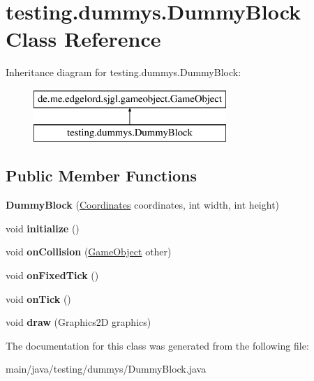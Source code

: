 \hypertarget{classtesting_1_1dummys_1_1_dummy_block}{}\section{testing.\+dummys.\+Dummy\+Block Class Reference}
\label{classtesting_1_1dummys_1_1_dummy_block}
Inheritance diagram for testing.\+dummys.\+Dummy\+Block\+:\begin{figure}[H]
\begin{center}
\leavevmode
\includegraphics[height=2.000000cm]{classtesting_1_1dummys_1_1_dummy_block}
\end{center}
\end{figure}
\subsection*{Public Member Functions}
\begin{DoxyCompactItemize}
\item 
\mbox{\label{classtesting_1_1dummys_1_1_dummy_block_afb4e413d6812d3b0d3d089701dc2aa95}} 
{\bfseries Dummy\+Block} (\mbox{\hyperlink{classde_1_1me_1_1edgelord_1_1sjgl_1_1location_1_1_coordinates}{Coordinates}} coordinates, int width, int height)
\item 
\mbox{\label{classtesting_1_1dummys_1_1_dummy_block_aed6daf192215fd235750c10ddef07c63}} 
void {\bfseries initialize} ()
\item 
\mbox{\label{classtesting_1_1dummys_1_1_dummy_block_aeab3c508f2f4db2d0e857c079b0da88c}} 
void {\bfseries on\+Collision} (\mbox{\hyperlink{classde_1_1me_1_1edgelord_1_1sjgl_1_1gameobject_1_1_game_object}{Game\+Object}} other)
\item 
\mbox{\label{classtesting_1_1dummys_1_1_dummy_block_adeedeca2d7c7a3955d57973ba96d5d05}} 
void {\bfseries on\+Fixed\+Tick} ()
\item 
\mbox{\label{classtesting_1_1dummys_1_1_dummy_block_adac9f974f9523ea690ce9091c894a268}} 
void {\bfseries on\+Tick} ()
\item 
\mbox{\label{classtesting_1_1dummys_1_1_dummy_block_a3da73a5ae035f6ddfc5f4a6513cc7b12}} 
void {\bfseries draw} (Graphics2D graphics)
\end{DoxyCompactItemize}


The documentation for this class was generated from the following file\+:\begin{DoxyCompactItemize}
\item 
main/java/testing/dummys/Dummy\+Block.\+java\end{DoxyCompactItemize}
